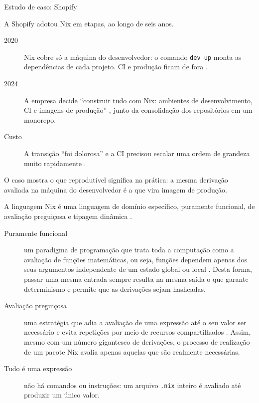 \documentclass{beamer}
\newcommand{\termo}[1]{\alert{#1}}
\newcommand{\code}[1]{\texttt{#1}}
\begin{document}
\begin{frame}{Estudo de caso: Shopify}
	\raggedright
	A Shopify adotou Nix em etapas, ao longo de seis anos.

	\medskip
	\begin{description}
		\item[2020] Nix cobre só a máquina do desenvolvedor: o comando \mbox{\code{dev up}} monta as dependências de cada projeto. CI e produção ficam de fora \cite{shopify-devup}.
		\item[2024] A empresa decide \enquote{construir tudo com Nix: ambientes de desenvolvimento, CI e imagens de produção} \cite{shopify-river}, junto da consolidação dos repositórios em um monorepo.
		\item[Custo] A transição \enquote{foi dolorosa} e a CI precisou escalar uma ordem de grandeza muito rapidamente \cite{shopify-river}.
	\end{description}

	\vfill
	O caso mostra o que \termo{reprodutível} significa na prática: a mesma derivação avaliada na máquina do desenvolvedor é a que vira imagem de produção.
	\vfill
\end{frame}

\begin{frame}{A linguagem}
	\small
	Nix é uma linguagem de domínio específico, puramente funcional, de avaliação preguiçosa e tipagem dinâmica \cite{nixdev-language}.

	\begin{description}
		\item[Puramente funcional] um paradigma de programação que trata toda a computação como a avaliação de funções matemáticas, ou seja, funções dependem apenas dos seus argumentos independente de um estado global ou local \cite{wikipedia-functional}. Desta forma, passar uma mesma entrada sempre resulta na mesma saída o que garante determinismo e permite que as derivações sejam hasheadas.
		\item[Avaliação preguiçosa] uma estratégia que adia a avaliação de uma expressão até o seu valor ser necessário e evita repetições por meio de recursos compartilhados \cite{wikipedia-lazy}. Assim, mesmo com um número gigantesco de derivações, o processo de realização de um pacote Nix avalia apenas aquelas que são realmente necessárias.
		\item[Tudo é uma expressão] não há comandos ou instruções: um arquivo \code{.nix} inteiro é avaliado até produzir um único valor.
	\end{description}
\end{frame}
\end{document}
